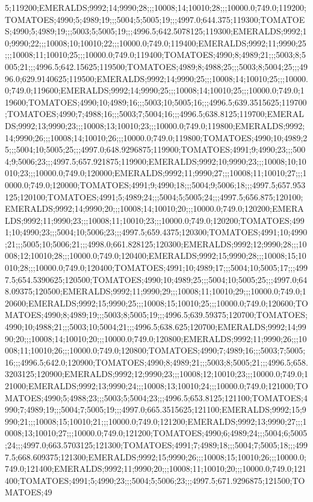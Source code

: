 5;119200;EMERALDS;9992;14;9990;28;;;10008;14;10010;28;;;10000.0;749.0;119200;TOMATOES;4990;5;4989;19;;;5004;5;5005;19;;;4997.0;644.375;119300;TOMATOES;4990;5;4989;19;;;5003;5;5005;19;;;4996.5;642.5078125;119300;EMERALDS;9992;10;9990;22;;;10008;10;10010;22;;;10000.0;749.0;119400;EMERALDS;9992;11;9990;25;;;10008;11;10010;25;;;10000.0;749.0;119400;TOMATOES;4990;8;4989;21;;;5003;8;5005;21;;;4996.5;642.15625;119500;TOMATOES;4989;8;4988;25;;;5003;8;5004;25;;;4996.0;629.9140625;119500;EMERALDS;9992;14;9990;25;;;10008;14;10010;25;;;10000.0;749.0;119600;EMERALDS;9992;14;9990;25;;;10008;14;10010;25;;;10000.0;749.0;119600;TOMATOES;4990;10;4989;16;;;5003;10;5005;16;;;4996.5;639.3515625;119700;TOMATOES;4990;7;4988;16;;;5003;7;5004;16;;;4996.5;638.8125;119700;EMERALDS;9992;13;9990;23;;;10008;13;10010;23;;;10000.0;749.0;119800;EMERALDS;9992;14;9990;26;;;10008;14;10010;26;;;10000.0;749.0;119800;TOMATOES;4990;10;4989;25;;;5004;10;5005;25;;;4997.0;648.9296875;119900;TOMATOES;4991;9;4990;23;;;5004;9;5006;23;;;4997.5;657.921875;119900;EMERALDS;9992;10;9990;23;;;10008;10;10010;23;;;10000.0;749.0;120000;EMERALDS;9992;11;9990;27;;;10008;11;10010;27;;;10000.0;749.0;120000;TOMATOES;4991;9;4990;18;;;5004;9;5006;18;;;4997.5;657.953125;120100;TOMATOES;4991;5;4989;24;;;5004;5;5005;24;;;4997.5;656.875;120100;EMERALDS;9992;14;9990;20;;;10008;14;10010;20;;;10000.0;749.0;120200;EMERALDS;9992;11;9990;23;;;10008;11;10010;23;;;10000.0;749.0;120200;TOMATOES;4991;10;4990;23;;;5004;10;5006;23;;;4997.5;659.4375;120300;TOMATOES;4991;10;4990;21;;;5005;10;5006;21;;;4998.0;661.828125;120300;EMERALDS;9992;12;9990;28;;;10008;12;10010;28;;;10000.0;749.0;120400;EMERALDS;9992;15;9990;28;;;10008;15;10010;28;;;10000.0;749.0;120400;TOMATOES;4991;10;4989;17;;;5004;10;5005;17;;;4997.5;654.5390625;120500;TOMATOES;4990;10;4989;25;;;5004;10;5005;25;;;4997.0;648.09375;120500;EMERALDS;9992;11;9990;29;;;10008;11;10010;29;;;10000.0;749.0;120600;EMERALDS;9992;15;9990;25;;;10008;15;10010;25;;;10000.0;749.0;120600;TOMATOES;4990;8;4989;19;;;5003;8;5005;19;;;4996.5;639.59375;120700;TOMATOES;4990;10;4988;21;;;5003;10;5004;21;;;4996.5;638.625;120700;EMERALDS;9992;14;9990;20;;;10008;14;10010;20;;;10000.0;749.0;120800;EMERALDS;9992;11;9990;26;;;10008;11;10010;26;;;10000.0;749.0;120800;TOMATOES;4990;7;4989;16;;;5003;7;5005;16;;;4996.5;642.0;120900;TOMATOES;4990;8;4989;21;;;5003;8;5005;21;;;4996.5;658.3203125;120900;EMERALDS;9992;12;9990;23;;;10008;12;10010;23;;;10000.0;749.0;121000;EMERALDS;9992;13;9990;24;;;10008;13;10010;24;;;10000.0;749.0;121000;TOMATOES;4990;5;4988;23;;;5003;5;5004;23;;;4996.5;653.8125;121100;TOMATOES;4990;7;4989;19;;;5004;7;5005;19;;;4997.0;665.3515625;121100;EMERALDS;9992;15;9990;21;;;10008;15;10010;21;;;10000.0;749.0;121200;EMERALDS;9992;13;9990;27;;;10008;13;10010;27;;;10000.0;749.0;121200;TOMATOES;4990;6;4989;24;;;5004;6;5005;24;;;4997.0;663.5703125;121300;TOMATOES;4991;7;4989;18;;;5004;7;5005;18;;;4997.5;668.609375;121300;EMERALDS;9992;15;9990;26;;;10008;15;10010;26;;;10000.0;749.0;121400;EMERALDS;9992;11;9990;20;;;10008;11;10010;20;;;10000.0;749.0;121400;TOMATOES;4991;5;4990;23;;;5004;5;5006;23;;;4997.5;671.9296875;121500;TOMATOES;49